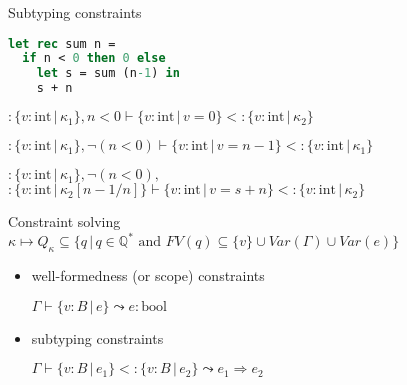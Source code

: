 \begin{frame}[containsverbatim]{Subtyping constraints}
\begin{lstlisting}[language=ML, basicstyle=\small]
let rec sum n =
  if n < 0 then 0 else
    let s = sum (n-1) in
    s + n
\end{lstlisting}
$\colon\{v\colon\text{int}\,|\, \kappa_1\},n < 0\vdash\{v\colon\text{int}\,|\, v = 0\}<\colon\{v\colon\text{int}\,|\, \kappa_2\}$

$\colon\{v\colon\text{int}\,|\, \kappa_1\},\neg(n < 0)\vdash\{v\colon\text{int}\,|\, v = n-1\}<\colon\{v\colon\text{int}\,|\, \kappa_1\}$

$\colon\{v\colon\text{int}\,|\, \kappa_1\},\neg(n < 0),\,$$\colon\{v\colon\text{int}\,|\, \kappa_2\left[n-1/n\right]\}\vdash\{v\colon\text{int}\,|\, v = s+n\}<\colon\{v\colon\text{int}\,|\, \kappa_2\}$
\end{frame}

\begin{frame}[containsverbatim]{Constraint solving}
$\kappa \mapsto Q_{\kappa}\subseteq \{q \,|\, q\in\mathbb{Q}^* \text{ and } FV(q)\subseteq \{v\} \cup Var(\Gamma) \cup Var(e)\}$

\begin{itemize}
\item well-formedness (or scope) constraints

$\Gamma\vdash\{v\colon B\,|\,e\}\leadsto e\colon\text{bool}$
\item subtyping constraints

$\Gamma\vdash\{v\colon B\,|\,e_1\} <\colon \{v\colon B\,|\,e_2\}\leadsto e_1\Rightarrow e_2$
\end{itemize}
\end{frame}